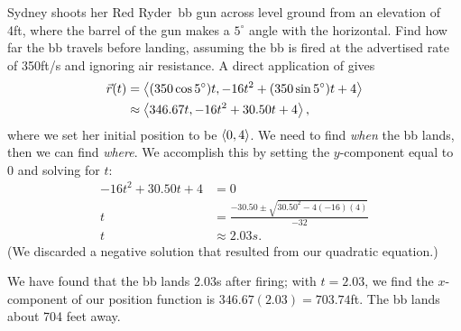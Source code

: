 \begin{example}\label{ex_motion5}%
Sydney shoots her Red Ryder\textregistered\ bb gun across level ground from an elevation of 4ft, where the barrel of the gun makes a $5^\circ$ angle with the horizontal. Find how far the bb travels before landing, assuming the bb is fired at the advertised rate of 350ft/s and ignoring air resistance.
\solution
A direct application of  gives
\begin{align*}
\vec r(t) &=\left\langle (350\cos 5^\circ)t, -16t^2 + (350\sin 5^\circ)t + 4\right\rangle\\
&\approx\left\langle 346.67t, -16t^2+30.50t+4\right\rangle,
\end{align*}
where we set her initial position to be $\left\langle 0,4\right\rangle$.
We need to find \emph{when} the bb lands, then we can find \emph{where}. We accomplish this by setting the $y$-component equal to 0 and solving for $t$:
\begin{align*}
-16t^2+30.50t+4 &= 0 \\
t &= \frac{-30.50 \pm \sqrt{30.50^2-4(-16)(4)}}{-32}\\
t &\approx 2.03s.
\end{align*}
(We discarded a negative solution that resulted from our quadratic equation.) 

We have found that the bb lands 2.03s after firing; with $t=2.03$, we find the $x$-component of our position function is $346.67(2.03) = 703.74$ft. The bb lands about 704 feet away.
\end{example}

